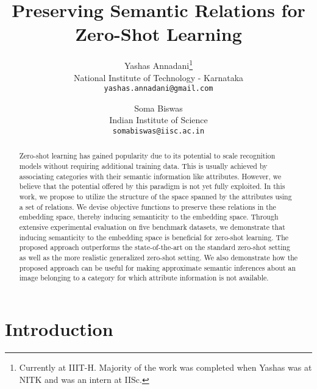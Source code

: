 \documentclass[10pt,twocolumn,letterpaper]{article}
\begin{document}
\title{ Preserving Semantic Relations for Zero-Shot Learning}

\author{Yashas Annadani\thanks{Currently at IIIT-H. Majority of the work was completed when Yashas was at NITK and was an intern at IISc.}\\
	National Institute of Technology - Karnataka\\
	{\tt\small yashas.annadani@gmail.com}
	\and
	Soma Biswas\\
	Indian Institute of Science\\
	{\tt\small somabiswas@iisc.ac.in}
}

\maketitle


\begin{abstract}
Zero-shot learning has gained popularity due to its potential to scale recognition models without requiring additional training data. 
This is usually achieved by associating categories with their semantic information like attributes. However, we believe that the potential offered by this paradigm is not yet fully exploited. 
In this work, we propose to utilize the structure of the space spanned by the attributes using a set of relations.
We devise objective functions to preserve these relations in the embedding space, thereby inducing semanticity to the embedding space. %
Through extensive experimental evaluation on five benchmark datasets, we demonstrate that inducing semanticity to the embedding space is beneficial for zero-shot learning. %
The proposed approach outperforms the state-of-the-art on the standard zero-shot setting as well as the more realistic generalized zero-shot setting.
We also demonstrate how the proposed approach can be useful for making approximate semantic inferences about an image belonging to a category for which attribute information is not available.   


\end{abstract}

\section{Introduction}
\end{document}
